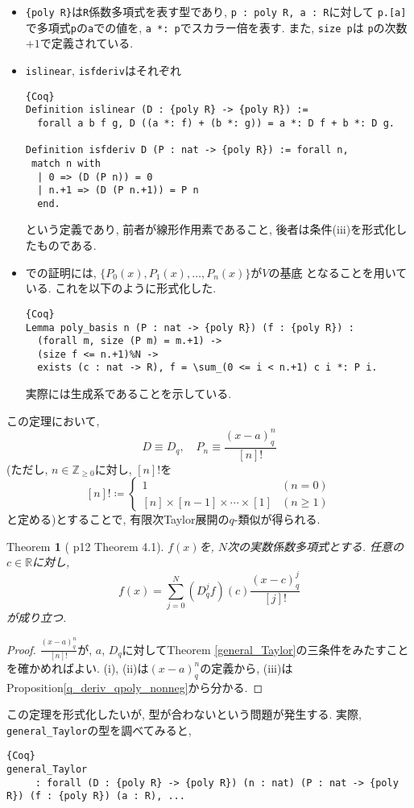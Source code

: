 \documentclass[11pt]{jarticle}
\theoremstyle{mystyle}
\newtheorem{thm}[df]{$\textrm{Theorem}$}
\newcommand{\bthm}{\begin{shadebox} \begin{thm}}
\newcommand{\ethm}{\end{thm} \end{shadebox}}
\newcommand{\bpf}{\begin{proof}}
\newcommand{\epf}{\end{proof}}
\newcommand{\Z}{\mathbb{Z}}
\newcommand{\R}{\mathbb{R}}
\newcommand{\0}{\textbf{0}}
\newcommand{\1}{\textbf{1}}
\newcommand{\2}{\textbf{2}}
\begin{document}
\begin{itemize}
  \item {\tt \{poly R\}}は{\tt R}係数多項式を表す型であり, {\tt p : {poly R}, a : R}に対して
  {\tt p.[a]}で多項式{\tt p}の{\tt a}での値を, {\tt a *: p}でスカラー倍を表す. また, {\tt size p}は
  {\tt p}の次数$+ 1$で定義されている. 
  \item {\tt islinear}, {\tt isfderiv}はそれぞれ
    \begin{lstlisting}{Coq}
Definition islinear (D : {poly R} -> {poly R}) :=
  forall a b f g, D ((a *: f) + (b *: g)) = a *: D f + b *: D g.

Definition isfderiv D (P : nat -> {poly R}) := forall n,
 match n with
  | 0 => (D (P n)) = 0
  | n.+1 => (D (P n.+1)) = P n
  end. \end{lstlisting}
    という定義であり, 前者が線形作用素であること, 後者は条件(iii)を形式化したものである. 
  \item \cite{Kac}での証明には, $\{P_0(x), P_1(x), \ldots , P_n(x)\}$が$V$の基底
    となることを用いている. これを以下のように形式化した. 
    \begin{lstlisting}{Coq}
Lemma poly_basis n (P : nat -> {poly R}) (f : {poly R}) :
  (forall m, size (P m) = m.+1) ->
  (size f <= n.+1)%N ->
  exists (c : nat -> R), f = \sum_(0 <= i < n.+1) c i *: P i. \end{lstlisting}
    実際には生成系であることを示している. 
\end{itemize}
この定理において, 
\[
  D \equiv D_q, \quad P_n \equiv \frac{(x-a)^n_q}{[n]!}
\]
(ただし, $n\in\Z_{\ge0}$に対し, $[n]!$を
\[
    [n]! \coloneqq \begin{cases}
                          1 & (n=0)\\
                          [n]\times[n-1]\times\cdots\times[1] & (n\ge1)
                        \end{cases}
\]
と定める)とすることで, 有限次Taylor展開の$q$-類似が得られる. 
\bthm[\cite{Kac} p12 Theorem 4.1]
$f(x)$を, $N$次の実数係数多項式とする. 任意の$c\in\R$に対し, 
  \[
    f(x) = \sum_{j=0}^N (D_q^jf)(c)\frac{(x-c)^j_q}{[j]!}
  \]
が成り立つ. 
\ethm
\bpf
$\frac{(x-a)^n_q}{[n]!}$が, $a$, $D_q$に対してTheorem \ref{general_Taylor}の三条件をみたすことを確かめればよい. (i), (ii)は$(x-a)^n_q$の定義から, (iii)はProposition\ref{q_deriv_qpoly_nonneg}から分かる. 
\epf
この定理を形式化したいが, 型が合わないという問題が発生する. 実際, {\tt general\_Taylor}の型を調べてみると, 
\begin{lstlisting}{Coq}
general_Taylor
     : forall (D : {poly R} -> {poly R}) (n : nat) (P : nat -> {poly R}) (f : {poly R}) (a : R), ...\end{lstlisting}
\end{document}
